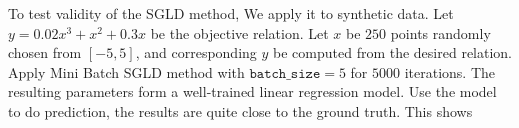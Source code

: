 \documentclass[10pt]{amsart}
\begin{document}
To test validity of the SGLD method, We apply it to synthetic data. Let $y=0.02x^3+x^2+0.3x$ be the objective relation. Let $x$ be $250$ points randomly chosen from $[-5,5]$, and corresponding $y$ be computed from the desired relation. Apply Mini Batch SGLD method with $\texttt{batch\_size}=5$ for $5000$ iterations. The resulting parameters form a well-trained linear regression model. Use the model to do prediction, the results are quite close to the ground truth. This shows 




\end{document}

